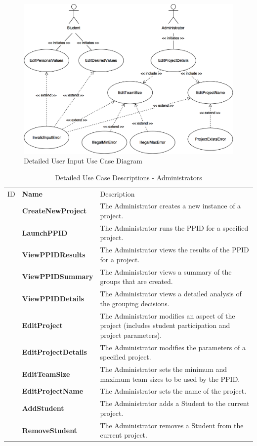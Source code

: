 \documentclass[12pt,letterpaper]{article}
\begin{document}
\begin{figure}[H]
	\centering{}
	\includegraphics[scale=0.3]{imgs/detailed-user-input-use-case-diagram.png}
	\caption{Detailed User Input Use Case Diagram}
\end{figure}

\begin{table}[H]
	\caption{Detailed Use Case Descriptions - Administrators}
	\vspace{1em}
	\begin{tabu} to 
	    \tableheader{}ID & Name & Description\\
		\createnewproject{} & CreateNewProject & The Administrator creates a new instance of a project.\\
		\launchppid{} & LaunchPPID & The Administrator runs the PPID for a specified project.\\
		\viewppidresults{} & ViewPPIDResults & The Administrator views the results of the PPID for a project. \\
		\viewppidsummary{} & ViewPPIDSummary & The Administrator views a summary of the groups that are created. \\
		\viewppiddetails{} & ViewPPIDDetails & The Administrator views a detailed analysis of the grouping decisions. \\
		\editproject{} & EditProject & The Administrator modifies an aspect of the project (includes student participation 
		and project parameters).\\
		\editprojectdetails{} & EditProjectDetails & The Administrator modifies the parameters of a specified project.\\
		\editteamsize{} & EditTeamSize & The Administrator sets the minimum and maximum team sizes to be used by the PPID. \\
		\editprojectname{} & EditProjectName & The Administrator sets the name of the project. \\
		\addstudent{} & AddStudent & The Administrator adds a Student to the current project.\\
		\removestudent{} & RemoveStudent & The Administrator removes a Student from the current project.\\
	\end{tabu}
\end{table}
\end{document}
